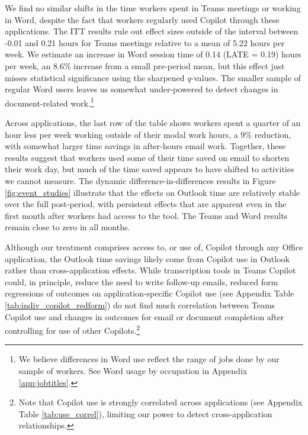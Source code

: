 \documentclass{article}
\begin{document}
We find no similar shifts in the time workers spent in Teams meetings or working in Word, despite the fact that workers regularly used Copilot through these applications. The ITT results rule out effect sizes outside of the interval between -0.01 and 0.21 hours for Teams meetings relative to a mean of 5.22 hours per week. We estimate an increase in Word session time of 0.14 (LATE = 0.19) hours per week, an 8.6\% increase from a small pre-period mean, but this effect just misses statistical significance using the sharpened $q$-values. The smaller sample of regular Word users leaves us somewhat under-powered to detect changes in document-related work.\footnote{We believe differences in Word use reflect the range of jobs done by our sample of workers. See Word usage by occupation in Appendix \ref{app:jobtitles}.} 

Across applications, the last row of the table shows workers spent a quarter of an hour less per week working outside of their modal work hours, a 9\% reduction, with somewhat larger time savings in after-hours email work. Together, these results suggest that workers used some of their time saved on email to shorten their work day, but much of the time saved appears to have shifted to activities we cannot measure. The dynamic difference-in-differences results in Figure \ref{fig:event_studies} illustrate that the effects on Outlook time are relatively stable over the full post-period, with persistent effects that are apparent even in the first month after workers had access to the tool. The Teams and Word results remain close to zero in all months. 

Although our treatment comprises access to, or use of, Copilot through any Office application, the Outlook time savings likely come from Copilot use in Outlook rather than cross-application effects.  While transcription tools in Teams Copilot could, in principle, reduce the need to write follow-up emails, reduced form regressions of outcomes on application-specific Copilot use (see Appendix Table \ref{tab:indiv_copilot_redform}) do not find much correlation between Teams Copilot use and changes in outcomes for email or document completion after controlling for use of other Copilots.\footnote{Note that Copilot use is strongly correlated across applications (see Appendix Table \ref{tab:use_correl}), limiting our power to detect cross-application relationships.} 
\end{document}
